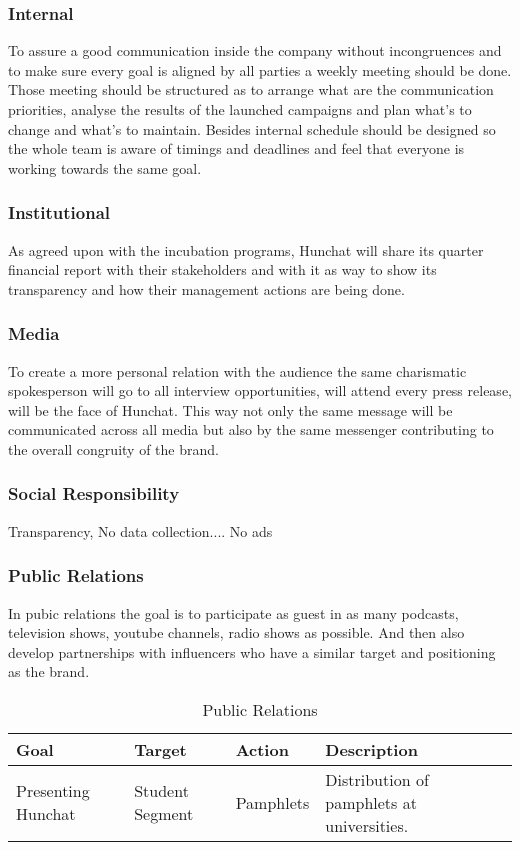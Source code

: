\documentclass[12pt]{article}
\begin{document}
	\subsubsection{Internal}
	To assure a good communication inside the company without incongruences and to make sure every goal is aligned by all parties a weekly meeting should be done. Those meeting should be structured as to arrange what are the communication priorities, analyse the results of the launched campaigns and plan what's to change and what's to maintain. Besides internal schedule should be designed so the whole team is aware of timings and deadlines and feel that everyone is working towards the same goal.
	
	\subsubsection{Institutional}
	As agreed upon with the incubation programs, Hunchat will share its quarter financial report with their stakeholders and with it as way to show its transparency and how their management actions are being done.
	
	\subsubsection{Media}
	To create a more personal relation with the audience the same charismatic spokesperson will go to all interview opportunities, will attend every press release, will be the face of Hunchat. This way not only the same message will be communicated across all media but also by the same messenger contributing to the overall congruity of the brand.
	
	\subsubsection{Social Responsibility}
	Transparency, No data collection.... No ads
	
	\subsubsection{Public Relations}
	In pubic relations the goal is to participate as guest in as many podcasts, television shows, youtube channels, radio shows as possible. And then also develop partnerships with influencers who have a similar target and positioning as the brand.
	
	\begin{table}[htbp]
	\small
	\caption{Public Relations}
	\label{table:pr}
	\centering
	\begin{tabular}{ @{}P{0.18\textwidth}P{0.17\textwidth}P{0.16\textwidth}P{0.38\textwidth} }
Goal	&	Target		&	Action	&	Description	 \\ \hline
Presenting Hunchat	&	Student Segment   &	Pamphlets	& 	Distribution of pamphlets at universities. 
	 \\ \hline
	\end{tabular}
	\end{table}
	
\end{document}
